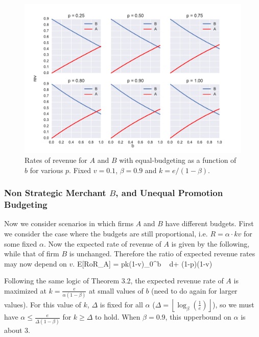 \begin{figure}[h!]
\begin{centering}
\includegraphics[scale = 0.75]{./figures/eq_budg_vary_p_v01.pdf}
\caption{Rates of revenue for $A$ and $B$ with equal-budgeting as a function of $b$ for various $p$. Fixed $v = 0.1$, $\beta = 0.9$ and $k = e/(1-\beta)$.}
\label{fig:eq_budg_vary_p}
\end{centering}
\end{figure}

\subsubsection{Non Strategic Merchant $B$, and Unequal Promotion Budgeting}

Now we consider scenarios in which firms $A$ and $B$ have different budgets. First we consider the case where the budgets are still proportional, i.e. $R = \alpha \cdot kv$ for some fixed $\alpha$. Now the expected rate of revenue of $A$ is given by the following, while that of firm $B$ is unchanged. Therefore the ratio of expected revenue rates may now depend on $v$.
\beq
{}E[RoR_A] = pk(1-\alpha v)\int_0^b  \mbox{ } d\lambda + (1-p)(1-\alpha v)
\eeq

Following the same logic of Theorem 3.2, the expected revenue rate of $A$ is maximized at $k = \frac{e}{\alpha(1-\beta)}$ at small values of $b$ (need to do again for larger values). For this value of $k$, $\Delta$ is fixed for all $\alpha$ ($\Delta = \left \lfloor \log_{\beta} \left(\frac{1}{e} \right) \right \rfloor$), so we must have $\alpha \leq \frac{e}{\Delta(1-\beta)}$ for $k \geq \Delta$ to hold. When $\beta = 0.9$, this upperbound on $\alpha$ is about 3.

